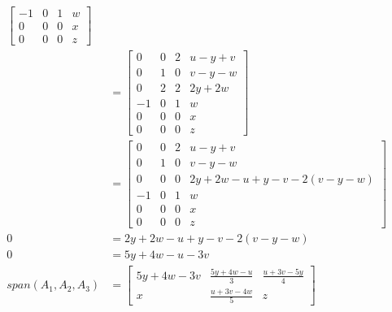 \documentclass{math}
\begin{document}
\begin{align*}
\begin{bmatrix}
    -1 & 0 & 1 & w \\
    0 & 0 & 0 & x \\
    0 & 0 & 0 & z
  \end{bmatrix} \\
  &= \begin{bmatrix}
    0 & 0 & 2 & u-y+v \\
    0 & 1 & 0 & v-y-w \\
    0 & 2 & 2 & 2y+2w \\
    -1 & 0 & 1 & w \\
    0 & 0 & 0 & x \\
    0 & 0 & 0 & z
  \end{bmatrix} \\
  &= \begin{bmatrix}
    0 & 0 & 2 & u-y+v \\
    0 & 1 & 0 & v-y-w \\
    0 & 0 & 0 & 2y+2w-u+y-v-2(v-y-w) \\
    -1 & 0 & 1 & w \\
    0 & 0 & 0 & x \\
    0 & 0 & 0 & z
  \end{bmatrix} \\
  0 &= 2y+2w-u+y-v-2(v-y-w) \\
  0 &= 5y+4w-u-3v \\
  span(A_1,A_2,A_3) &= \begin{bmatrix}
    5y+4w-3v & \frac{5y+4w-u}{3} & \frac{u+3v-5y}{4} \\
    x & \frac{u+3v-4w}{5} & z
  \end{bmatrix}
\end{align*}
\end{document}
